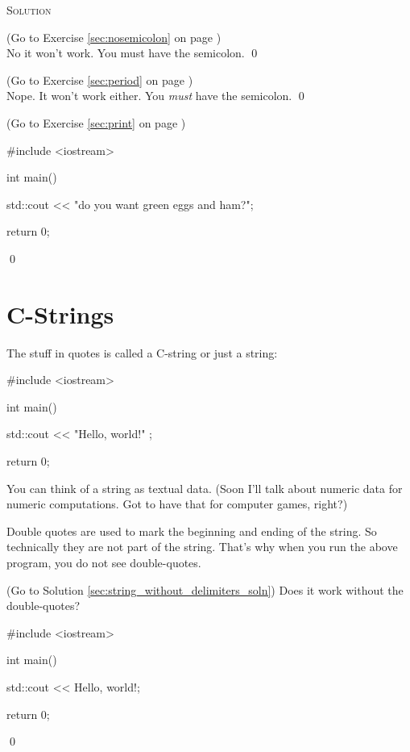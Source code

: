 \newpage\textsc{Solution}

\begin{soln}
\label{sec:nosemicolon_soln} 
(Go to Exercise \ref{sec:nosemicolon} 
on page \pageref{sec:nosemicolon})
\\
No it won't work. 
You must have the semicolon.
\qed
\end{soln}


\begin{soln}
\label{sec:period_soln} 
(Go to Exercise \ref{sec:period} 
on page \pageref{sec:period})
\\
Nope. It won't work either. 
You \textit{must} have the semicolon.
\qed
\end{soln}


\begin{soln}
\label{sec:print_soln} 
(Go to Exercise \ref{sec:print} 
on page \pageref{sec:print})
\begin{console}
#include <iostream>

int main()
{
    std::cout << "do you want green eggs and ham?\n";

    return 0;
}
\end{console}
\qed
\end{soln}





\newpage\section{C-Strings}

The stuff in quotes is called a C-string or just a string:
\begin{console}
#include <iostream>

int main()
{
    std::cout << "Hello, world!\n" ;

    return 0;
}
\end{console}

You can think of a string as textual data. 
(Soon I'll talk about numeric data for numeric computations. 
Got to have that for computer games, right?)

Double quotes are used to mark the beginning and ending of the string. 
So technically they are not part of the string. 
That's why when you run the above program, you do not see double-quotes.


\begin{ex} \label{sec:string_without_delimiters}
(Go to Solution \ref{sec:string_without_delimiters_soln})
Does it work without the double-quotes?
\begin{console}
#include <iostream>

int main()
{
    std::cout << Hello, world!\n;

    return 0;
}
\end{console}
\qed
\end{ex}

